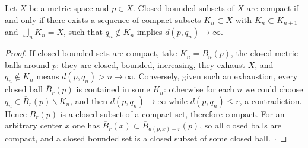 \begin{lemma}
  \label{lem:dc-ch7-2-8-b-iff-e}
  \leanok
  Let $X$ be a metric space and $p\in X$. Closed bounded subsets of $X$ are
  compact if and only if there exists a sequence of compact subsets
  $K_n\subset X$ with $K_n\subset K_{n+1}$ and $\bigcup_n K_n=X$, such that
  $q_n\notin K_n$ implies $d(p,q_n)\to\infty$.
\end{lemma}
\begin{proof}
  \leanok
  If closed bounded sets are compact, take $K_n=\overline{B}_n(p)$, the
  closed metric balls around $p$: they are closed, bounded, increasing, they
  exhaust $X$, and $q_n\notin K_n$ means $d(p,q_n)>n\to\infty$. Conversely,
  given such an exhaustion, every closed ball $\overline{B}_r(p)$ is
  contained in some $K_n$: otherwise for each $n$ we could choose
  $q_n\in\overline{B}_r(p)\smallsetminus K_n$, and then $d(p,q_n)\to\infty$
  while $d(p,q_n)\le r$, a contradiction. Hence $\overline{B}_r(p)$ is a
  closed subset of a compact set, therefore compact. For an arbitrary center
  $x$ one has $\overline{B}_r(x)\subset\overline{B}_{d(p,x)+r}(p)$, so all
  closed balls are compact, and a closed bounded set is a closed subset of
  some closed ball. $\square$
\end{proof}

